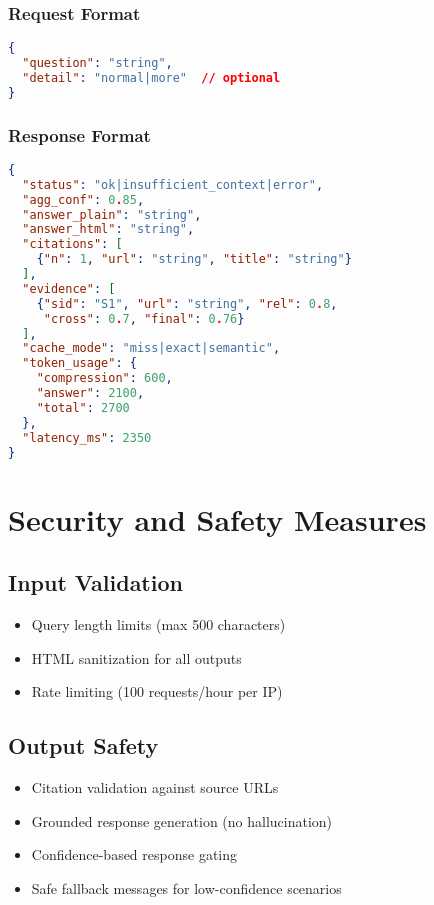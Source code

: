 \documentclass[11pt,a4paper]{article}
\begin{document}
\subsubsection{Request Format}
\begin{lstlisting}[language=json]
{
  "question": "string",
  "detail": "normal|more"  // optional
}
\end{lstlisting}

\subsubsection{Response Format}
\begin{lstlisting}[language=json]
{
  "status": "ok|insufficient_context|error",
  "agg_conf": 0.85,
  "answer_plain": "string",
  "answer_html": "string",
  "citations": [
    {"n": 1, "url": "string", "title": "string"}
  ],
  "evidence": [
    {"sid": "S1", "url": "string", "rel": 0.8, 
     "cross": 0.7, "final": 0.76}
  ],
  "cache_mode": "miss|exact|semantic",
  "token_usage": {
    "compression": 600, 
    "answer": 2100, 
    "total": 2700
  },
  "latency_ms": 2350
}
\end{lstlisting}

\section{Security and Safety Measures}

\subsection{Input Validation}
\begin{itemize}
    \item Query length limits (max 500 characters)
    \item HTML sanitization for all outputs
    \item Rate limiting (100 requests/hour per IP)
\end{itemize}

\subsection{Output Safety}
\begin{itemize}
    \item Citation validation against source URLs
    \item Grounded response generation (no hallucination)
    \item Confidence-based response gating
    \item Safe fallback messages for low-confidence scenarios
\end{itemize}
\end{document}
